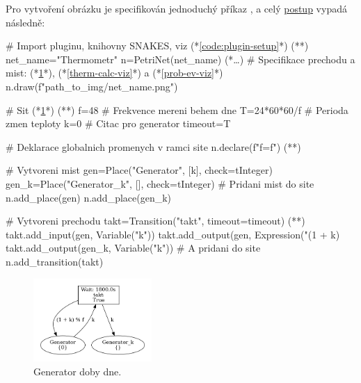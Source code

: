 Pro vytvoření obrázku je specifikován jednoduchý příkaz , a celý \hyperref[code:thermometr-draw]{postup} vypadá následně:

\begin{python}
  # Import pluginu, knihovny SNAKES, viz (*\ref{code:plugin-setup}*) (*\label{code:thermometr-draw}*)
  net_name="Thermometr"
  n=PetriNet(net_name)
  (*\ldots*) # Specifikace prechodu a mist: (*\ref{therm-gen-viz}*), (*\ref{therm-calc-viz}*) a (*\ref{prob-ev-viz}*)
  n.draw(f"{path_to_img}/{net_name}.png")
\end{python}

\begin{python}
  # Sit (*\ref{therm-gen-viz}*) (*\label{code:gen-therm-draw}*)
  f=48 # Frekvence mereni behem dne
  T=24*60*60/f # Perioda zmen teploty
  k=0 # Citac pro generator
  timeout=T
  
  # Deklarace globalnich promenych v ramci site
  n.declare(f"f={f}") (*\label{code:snakes-glob-var}*)
  
  # Vytvoreni mist
  gen=Place("Generator", [k], check=tInteger)
  gen_k=Place("Generator_k", [], check=tInteger)
  # Pridani mist do site
  n.add_place(gen)
  n.add_place(gen_k)

  # Vytvoreni prechodu
  takt=Transition("takt", timeout=timeout) (*\label{code:timed-temp-example}*)
  takt.add_input(gen, Variable("k"))
  takt.add_output(gen, Expression("(1 + k) %
  takt.add_output(gen_k, Variable("k"))
  # A pridani do site
  n.add_transition(takt)
\end{python}

\begin{figure}[htb]
  \centering
  \includegraphics[width=0.4\textwidth]{obrazky-figures/therm-gen.png}
  \caption{Generator doby dne.}
  \label{therm-gen-viz}
\end{figure}

